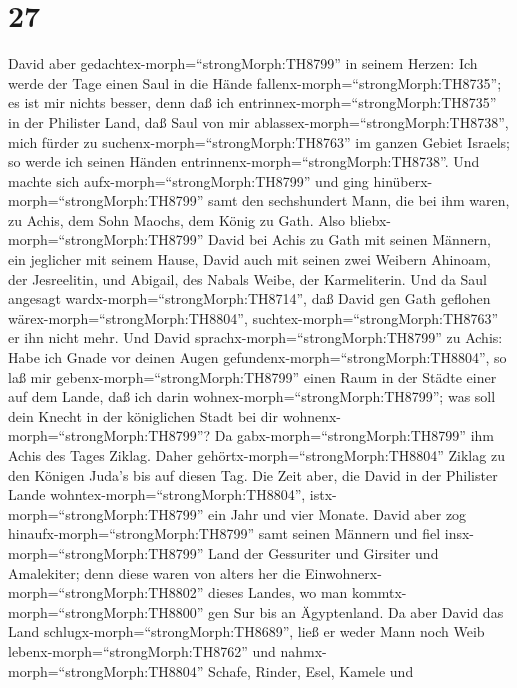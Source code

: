 \hypertarget{section-26}{%
\section{27}\label{section-26}}

 David aber gedachtex-morph=``strongMorph:TH8799'' in seinem
Herzen: Ich werde der Tage einen Saul in die Hände
fallenx-morph=``strongMorph:TH8735''; es ist mir nichts besser, denn daß
ich entrinnex-morph=``strongMorph:TH8735'' in der Philister Land, daß
Saul von mir ablassex-morph=``strongMorph:TH8738'', mich fürder zu
suchenx-morph=``strongMorph:TH8763'' im ganzen Gebiet Israels; so werde
ich seinen Händen entrinnenx-morph=``strongMorph:TH8738''. 
Und machte sich aufx-morph=``strongMorph:TH8799'' und ging
hinüberx-morph=``strongMorph:TH8799'' samt den sechshundert Mann, die
bei ihm waren, zu Achis, dem Sohn Maochs, dem König zu Gath.
 Also bliebx-morph=``strongMorph:TH8799'' David bei Achis zu
Gath mit seinen Männern, ein jeglicher mit seinem Hause, David auch mit
seinen zwei Weibern Ahinoam, der Jesreelitin, und Abigail, des Nabals
Weibe, der Karmeliterin.  Und da Saul angesagt
wardx-morph=``strongMorph:TH8714'', daß David gen Gath geflohen
wärex-morph=``strongMorph:TH8804'', suchtex-morph=``strongMorph:TH8763''
er ihn nicht mehr.  Und David
sprachx-morph=``strongMorph:TH8799'' zu Achis: Habe ich Gnade vor deinen
Augen gefundenx-morph=``strongMorph:TH8804'', so laß mir
gebenx-morph=``strongMorph:TH8799'' einen Raum in der Städte einer auf
dem Lande, daß ich darin wohnex-morph=``strongMorph:TH8799''; was soll
dein Knecht in der königlichen Stadt bei dir
wohnenx-morph=``strongMorph:TH8799''?  Da
gabx-morph=``strongMorph:TH8799'' ihm Achis des Tages Ziklag. Daher
gehörtx-morph=``strongMorph:TH8804'' Ziklag zu den Königen Juda's bis
auf diesen Tag.  Die Zeit aber, die David in der Philister
Lande wohntex-morph=``strongMorph:TH8804'',
istx-morph=``strongMorph:TH8799'' ein Jahr und vier Monate. 
David aber zog hinaufx-morph=``strongMorph:TH8799'' samt seinen Männern
und fiel insx-morph=``strongMorph:TH8799'' Land der Gessuriter und
Girsiter und Amalekiter; denn diese waren von alters her die
Einwohnerx-morph=``strongMorph:TH8802'' dieses Landes, wo man
kommtx-morph=``strongMorph:TH8800'' gen Sur bis an Ägyptenland.
 Da aber David das Land
schlugx-morph=``strongMorph:TH8689'', ließ er weder Mann noch Weib
lebenx-morph=``strongMorph:TH8762'' und
nahmx-morph=``strongMorph:TH8804'' Schafe, Rinder, Esel, Kamele und
